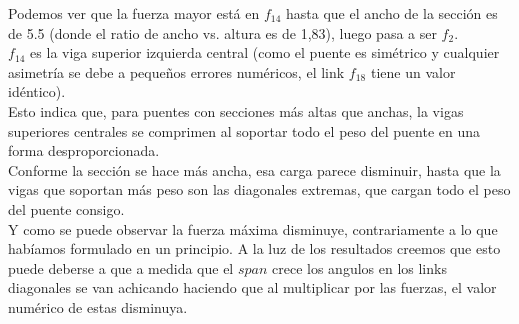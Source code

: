 Podemos ver que la fuerza mayor está en $f_14$ hasta que el ancho de la sección es de 5.5 (donde el ratio de ancho vs. altura es de 1,83), luego pasa a ser $f_2$.\\

$f_14$ es la viga superior izquierda central (como el puente es simétrico y cualquier asimetría se debe a pequeños errores numéricos, el link $f_18$ tiene un valor idéntico).\\

Esto indica que, para puentes con secciones más altas que anchas, la vigas superiores centrales se comprimen al soportar todo el peso del puente en una forma desproporcionada.\\

Conforme la sección se hace más ancha, esa carga parece disminuir, hasta que la vigas que soportan más peso son las diagonales extremas, que cargan todo el peso del puente consigo.\\

Y como se puede observar la fuerza máxima disminuye, contrariamente a lo que habíamos formulado en un principio. A la luz de los resultados creemos que esto puede deberse a que a medida que el $span$ crece los angulos en los links diagonales se van achicando haciendo que al multiplicar por las fuerzas, el valor numérico de estas disminuya.